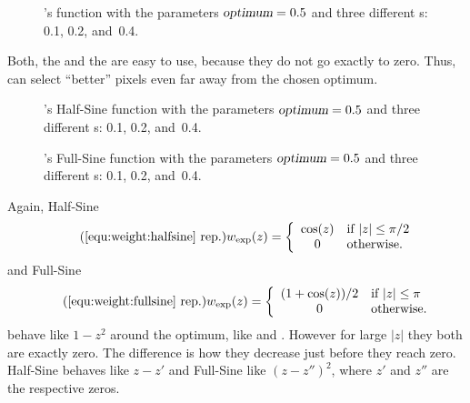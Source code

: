 \begin{figure}
  \ifreferencemanual\begin{maxipage}\fi
  \centering
  \ifreferencemanual\end{maxipage}\fi

  \caption[ function]{\label{fig:lorentzian}%
    \App{}'s  function with the parameters $\textsl{optimum} = 0.5$ and
    three different s: 0.1, 0.2, and~0.4.}
\end{figure}


Both, the  and the  are easy to use, because they do
not go exactly to zero.  Thus, \App{} can select ``better'' pixels even far away from the chosen
optimum.


\begin{figure}
  \ifreferencemanual\begin{maxipage}\fi
  \centering
  \ifreferencemanual\end{maxipage}\fi

  \caption[Half-Sine function]{\label{fig:halfsine}%
    \App{}'s Half-Sine function with the parameters $\textsl{optimum} = 0.5$ and three
    different s: 0.1, 0.2, and~0.4.}
\end{figure}


\begin{figure}
  \ifreferencemanual\begin{maxipage}\fi
  \centering
  \ifreferencemanual\end{maxipage}\fi

  \caption[Full-Sine function]{\label{fig:fullsine}%
    \App{}'s Full-Sine function with the parameters $\textsl{optimum} = 0.5$ and three
    different s: 0.1, 0.2, and~0.4.}
\end{figure}


Again, Half-Sine
\begin{equation}\refrep{equ:weight:halfsine}
  w_{\mathrm{exp}}(z) =
  \left\{\begin{array}{cl}
  \cos(z) & \mbox{if } |z| \leq \pi/2 \\
  0       & \mbox{otherwise.}
  \end{array}\right.
\end{equation}
and Full-Sine
\begin{equation}\refrep{equ:weight:fullsine}
  w_{\mathrm{exp}}(z) =
  \left\{\begin{array}{cl}
  (1 + \cos(z)) / 2 & \mbox{if } |z| \leq \pi \\
  0                 & \mbox{otherwise.}
  \end{array} \right.
\end{equation}
\noindent behave like $1 - z^2$ around the optimum, like  and
.  However for large $|z|$ they both are exactly zero.  The difference is
how they decrease just before they reach zero.  Half-Sine behaves like $z - z'$ and Full-Sine
like $(z - z'')^2$, where $z'$ and $z''$ are the respective zeros.


